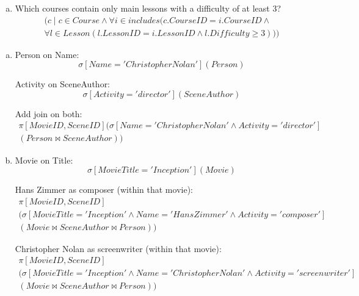 \documentclass{article}
\begin{document}
\begin{enumerate}[(a)]
\item Which courses contain only main lessons with a difficulty of at least 3?
\begin{equation}
    \begin{split}
    (c \mid c \in Course \wedge \forall i\in includes(c.CourseID = i.CourseID \wedge \\
    \forall l \in Lesson(l.LessonID=i.LessonID\wedge l.Difficulty \geq 3)))
    \end{split}
\end{equation}


\end{enumerate}

\task{}
\begin{enumerate}[(a)]
\item
Person on Name:
\begin{equation}
\sigma\left[Name='Christopher Nolan'\right](Person)
\end{equation}

Activity on SceneAuthor:
\begin{equation}
\sigma\left[Activity='director'\right](SceneAuthor)
\end{equation}

Add join on both:
\begin{multline}
\pi\left[MovieID,SceneID\right](\sigma\left[Name='Christopher Nolan' \land Activity='director'\right]\\
 (Person \Join SceneAuthor))
\end{multline}

\item
Movie on Title:
\begin{equation}
\sigma[MovieTitle='Inception'](Movie)
\end{equation}

Hans Zimmer as composer (within that movie):
\begin{multline}
\pi\left[MovieID,SceneID\right]\\
 (\sigma\left[MovieTitle='Inception' \land Name='Hans Zimmer' \land Activity='composer'\right]\\
 (Movie \Join SceneAuthor \Join Person))
\end{multline}

Christopher Nolan as screenwriter (within that movie):
\begin{multline}
\pi\left[MovieID,SceneID\right]\\
 (\sigma\left[MovieTitle='Inception' \land Name='Christopher Nolan' \land Activity='screenwriter'\right]\\
 (Movie \Join SceneAuthor \Join Person))
\end{multline}


\end{enumerate}
\end{document}
